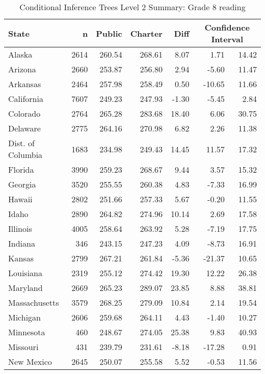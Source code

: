 \begin{table}[ht]
\begin{center}
\caption{Conditional Inference Trees Level 2 Summary: Grade 8 reading}
\label{g8readingtreelevel2}
\begin{tabular}{lrrrrrr}
  \hline
  State & n & Public & Charter & Diff & \multicolumn{2}{c}{Confidence Interval} \\ \hline
Alaska & 2614 & 260.54 & 268.61 & 8.07 & 1.71 & 14.42 \\ 
  Arizona & 2660 & 253.87 & 256.80 & 2.94 & -5.60 & 11.47 \\ 
  Arkansas & 2464 & 257.98 & 258.49 & 0.50 & -10.65 & 11.66 \\ 
  California & 7607 & 249.23 & 247.93 & -1.30 & -5.45 & 2.84 \\ 
  Colorado & 2764 & 265.28 & 283.68 & 18.40 & 6.06 & 30.75 \\ 
  Delaware & 2775 & 264.16 & 270.98 & 6.82 & 2.26 & 11.38 \\ 
  Dist. of Columbia & 1683 & 234.98 & 249.43 & 14.45 & 11.57 & 17.32 \\ 
  Florida & 3990 & 259.23 & 268.67 & 9.44 & 3.57 & 15.32 \\ 
  Georgia & 3520 & 255.55 & 260.38 & 4.83 & -7.33 & 16.99 \\ 
  Hawaii & 2802 & 251.66 & 257.33 & 5.67 & -0.20 & 11.55 \\ 
  Idaho & 2890 & 264.82 & 274.96 & 10.14 & 2.69 & 17.58 \\ 
  Illinois & 4005 & 258.64 & 263.92 & 5.28 & -7.19 & 17.75 \\ 
  Indiana & 346 & 243.15 & 247.23 & 4.09 & -8.73 & 16.91 \\ 
  Kansas & 2799 & 267.21 & 261.84 & -5.36 & -21.37 & 10.65 \\ 
  Louisiana & 2319 & 255.12 & 274.42 & 19.30 & 12.22 & 26.38 \\ 
  Maryland & 2669 & 265.23 & 289.07 & 23.85 & 8.88 & 38.81 \\ 
  Massachusetts & 3579 & 268.25 & 279.09 & 10.84 & 2.14 & 19.54 \\ 
  Michigan & 2606 & 259.68 & 264.11 & 4.43 & -1.40 & 10.27 \\ 
  Minnesota & 460 & 248.67 & 274.05 & 25.38 & 9.83 & 40.93 \\ 
  Missouri & 431 & 239.79 & 231.61 & -8.18 & -17.28 & 0.91 \\ 
  New Mexico & 2645 & 250.07 & 255.58 & 5.52 & -0.53 & 11.56 \\ 

\end{tabular}
\end{center}
\end{table}
